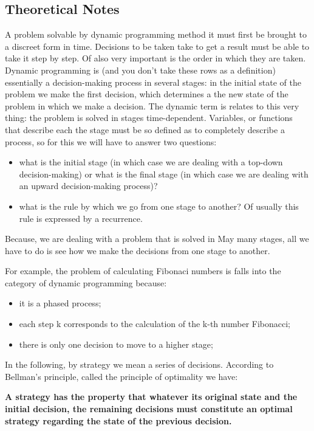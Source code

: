 \documentclass[a4paper, 12pt]{article}
\begin{document}
\subsection{Theoretical Notes}

A problem solvable by dynamic programming method it must first be brought to a discreet form in time. Decisions to be taken take to get a result must be able to take it step by step. Of also very important is the order in which they are taken. Dynamic programming is (and you don't take these rows as a definition) essentially a decision-making process in several stages: in the initial state of the problem we make the first decision, which determines a the new state of the problem in which we make a decision. The dynamic term is relates to this very thing: the problem is solved in stages time-dependent. Variables, or functions that describe each the stage must be so defined as to completely describe a process, so for this we will have to answer two questions:

\begin{itemize}
      \item what is the initial stage (in which case we are dealing with a top-down decision-making) or what is the final stage (in which case we are dealing with an upward decision-making process)?
      \item what is the rule by which we go from one stage to another? Of usually this rule is expressed by a recurrence.
\end{itemize}

Because, we are dealing with a problem that is solved in May many stages, all we have to do is see how we make the decisions from one stage to another.

For example, the problem of calculating Fibonaci numbers is falls into the category of dynamic programming because:

\begin{itemize}
      \item it is a phased process;
      \item each step k corresponds to the calculation of the k-th number Fibonacci;
      \item there is only one decision to move to a higher stage;
\end{itemize}

In the following, by strategy we mean a series of decisions. According to Bellman's principle, called the principle of optimality we have:

\textbf{A strategy has the property that whatever its original state and the initial decision, the remaining decisions must constitute an optimal strategy regarding the state of the previous decision.}
\end{document}
